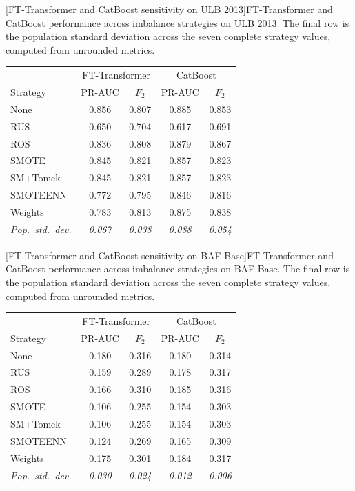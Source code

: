 \noindent\begin{minipage}{\linewidth}\centering
{}[FT-Transformer and CatBoost sensitivity on ULB 2013]{FT-Transformer and CatBoost performance across imbalance strategies on ULB 2013. The final row is the population standard deviation across the seven complete strategy values, computed from unrounded metrics.}
\label{tab:transformer_robustness_ulb}
\begin{tabular}{l cc cc}
\toprule
& \multicolumn{2}{c}{FT-Transformer} & \multicolumn{2}{c}{CatBoost} \\
Strategy & PR-AUC & $F_2$ & PR-AUC & $F_2$ \\
\midrule
None      & 0.856 & 0.807 & 0.885 & 0.853 \\
RUS       & 0.650 & 0.704 & 0.617 & 0.691 \\
ROS       & 0.836 & 0.808 & 0.879 & 0.867 \\
SMOTE     & 0.845 & 0.821 & 0.857 & 0.823 \\
SM+Tomek  & 0.845 & 0.821 & 0.857 & 0.823 \\
SMOTEENN  & 0.772 & 0.795 & 0.846 & 0.816 \\
Weights   & 0.783 & 0.813 & 0.875 & 0.838 \\
\midrule
\textit{Pop.\ std.\ dev.} & \textit{0.067} & \textit{0.038} & \textit{0.088} & \textit{0.054} \\
\bottomrule
\end{tabular}
\end{minipage}

\noindent\begin{minipage}{\linewidth}\centering
{}[FT-Transformer and CatBoost sensitivity on BAF Base]{FT-Transformer and CatBoost performance across imbalance strategies on BAF Base. The final row is the population standard deviation across the seven complete strategy values, computed from unrounded metrics.}
\label{tab:transformer_robustness_baf}
\begin{tabular}{l cc cc}
\toprule
& \multicolumn{2}{c}{FT-Transformer} & \multicolumn{2}{c}{CatBoost} \\
Strategy & PR-AUC & $F_2$ & PR-AUC & $F_2$ \\
\midrule
None      & 0.180 & 0.316 & 0.180 & 0.314 \\
RUS       & 0.159 & 0.289 & 0.178 & 0.317 \\
ROS       & 0.166 & 0.310 & 0.185 & 0.316 \\
SMOTE     & 0.106 & 0.255 & 0.154 & 0.303 \\
SM+Tomek  & 0.106 & 0.255 & 0.154 & 0.303 \\
SMOTEENN  & 0.124 & 0.269 & 0.165 & 0.309 \\
Weights   & 0.175 & 0.301 & 0.184 & 0.317 \\
\midrule
\textit{Pop.\ std.\ dev.} & \textit{0.030} & \textit{0.024} & \textit{0.012} & \textit{0.006} \\
\bottomrule
\end{tabular}
\end{minipage}


